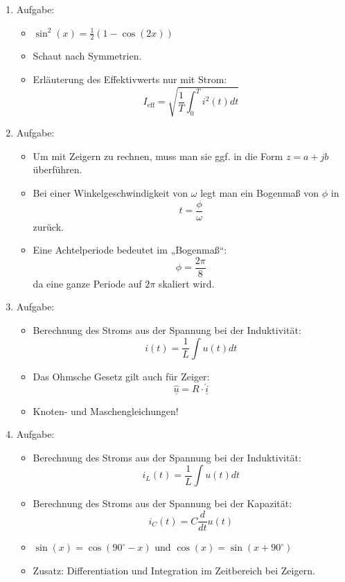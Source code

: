 \documentclass[11pt,a4paper]{article}
\begin{document}
\begin{enumerate}
    \item Aufgabe: 
    \begin{itemize}
        \item $\sin^2(x) = \frac{1}{2}(1 - \cos(2x))$
        \item Schaut nach Symmetrien.
        \item Erläuterung des Effektivwerts nur mit Strom: 
        \[
        I_{\text{eff}} = \sqrt{\frac{1}{T} \int_0^T i^2(t) dt}
        \]
    \end{itemize}

    \item Aufgabe:
    \begin{itemize}
        \item Um mit Zeigern zu rechnen, muss man sie ggf. in die Form $z = a + jb$ überführen.
        \item Bei einer Winkelgeschwindigkeit von $\omega$ legt man ein Bogenmaß von $\phi$ in 
        \[
        t = \frac{\phi}{\omega}
        \]
        zurück.
        \item Eine Achtelperiode bedeutet im „Bogenmaß“:
        \[
        \phi = \frac{2\pi}{8}
        \]
        da eine ganze Periode auf $2\pi$ skaliert wird.
    \end{itemize}

    \item Aufgabe: 
    \begin{itemize}
        \item Berechnung des Stroms aus der Spannung bei der Induktivität:
        \[
        i(t) = \frac{1}{L} \int u(t) dt
        \]
        \item Das Ohmsche Gesetz gilt auch für Zeiger:
        \[
        \hat{\underline{u}} = R \cdot \hat{\underline{i}}
        \]
        \item Knoten- und Maschengleichungen!  
    \end{itemize}

    \item Aufgabe: 
    \begin{itemize}
        \item Berechnung des Stroms aus der Spannung bei der Induktivität:
        \[
        i_L(t) = \frac{1}{L} \int u(t) dt
        \]
        \item Berechnung des Stroms aus der Spannung bei der Kapazität:
        \[
        i_C(t) = C \frac{d}{dt} u(t)
        \]
        \item $\sin(x) = \cos(90^\circ - x)$ und $\cos(x) = \sin(x + 90^\circ)$
        \item Zusatz: Differentiation und Integration im Zeitbereich bei Zeigern.
    \end{itemize}
\end{enumerate}
\newpage
\end{document}
